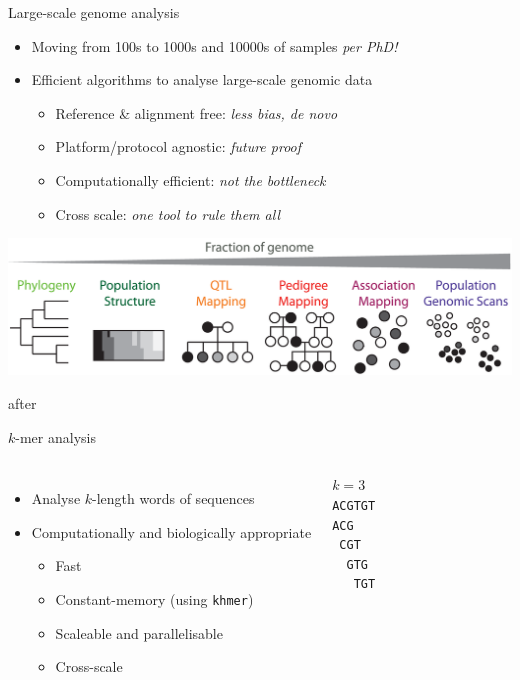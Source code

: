 \documentclass[t]{beamer}
\begin{document}
\begin{frame}{Large-scale genome analysis}
  \begin{itemize}
    \item Moving from 100s to 1000s and 10000s of samples \textit{per PhD!}
      \pause
    \item Efficient algorithms to analyse large-scale genomic data
    \begin{itemize}
      \item Reference \& alignment free: \textit{less bias, de novo}
      \item Platform/protocol agnostic: \textit{future proof}
      \item Computationally efficient: \textit{not the bottleneck}
      \item Cross scale: \textit{one tool to rule them all}
    \end{itemize}
  \end{itemize}
  \begin{center}
    \includegraphics[width=\textwidth]{img/cross-scale.png}
  \end{center}
  \tiny{after \textcite{peterson_double_2012}}
\end{frame}


\begin{frame}{$k$-mer analysis}
  \begin{columns}[t]
      \begin{itemize}
        \item<1-> Analyse $k$-length words of sequences
        \item<2> Computationally and biologically appropriate
        \begin{itemize}
          \item<2> Fast
          \item<2> Constant-memory (using \texttt{khmer})
          \item<2> Scaleable and parallelisable
          \item<2> Cross-scale
        \end{itemize}
      \end{itemize}
    $k = 3$\\
    \texttt{ACGTGT}\\
    \texttt{ACG~~~}\\
    \texttt{~CGT~~}\\
    \texttt{~~GTG~}\\
    \texttt{~~~TGT}
  \end{columns}
    \vfill
\end{frame}
\end{document}
